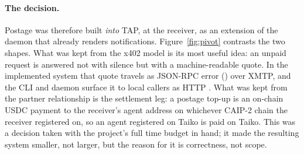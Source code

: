 \paragraph{The decision.}
Postage was therefore built \emph{into} TAP, at the receiver, as an extension of the
daemon that already renders notifications. Figure~\ref{fig:pivot} contrasts the two
shapes. What was kept from the x402 model is its most useful idea: an unpaid request is
answered not with silence but with a machine-readable quote. In the implemented system
that quote travels as JSON-RPC error  ()
over XMTP, and the CLI and daemon surface it to local callers as HTTP . What was
kept from the partner relationship is the settlement leg: a postage top-up is an on-chain
USDC payment to the receiver's agent address on whichever CAIP-2 chain the receiver
registered on, so an agent registered on Taiko is paid on Taiko. This was a decision taken
with the project's full time budget in hand; it made the resulting system smaller, not
larger, but the reason for it is correctness, not scope.

